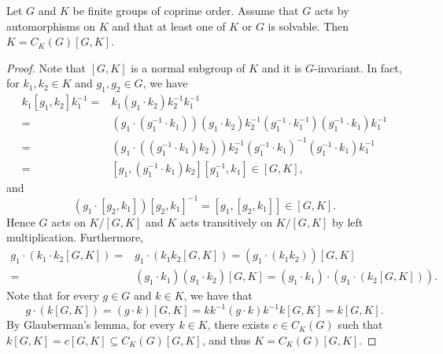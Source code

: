 
%


\begin{theorem}
\label{thm:K=C_K(G)[G,K]}
Let $G$ and $K$ be finite groups of coprime order. Assume that $G$ acts by automorphisms on $K$ and that at least one of $K$ or $G$ is solvable. Then $K=C_K(G)[G,K]$.   
\end{theorem}

\begin{proof}
    Note that $[G,K]$ is a normal subgroup of $K$ and it is $G$-invariant. In fact, for $k_1,k_2\in K$ and $g_1,g_2\in G$, we have
    \begin{align*}
        k_1[g_1,k_2]k_1^{-1}=&k_1(g_1\cdot k_2)k_2^{-1}k_1^{-1}\\
        =& (g_1\cdot (g_1^{-1}\cdot k_1))(g_1\cdot k_2)k_2^{-1}(g_1^{-1}\cdot k_1^{-1})(g_1^{-1}\cdot k_1)k_1^{-1}\\
        =& (g_1\cdot ((g_1^{-1}\cdot k_1)k_2))k_2^{-1}(g_1^{-1}\cdot k_1)^{-1}(g_1^{-1}\cdot k_1)k_1^{-1}\\
        =& [g_1,(g_1^{-1}\cdot k_1)k_2][g_1^{-1},k_1]\in [G,K],
    \end{align*}
    and
    \[ (g_1\cdot [g_2,k_1])[g_2,k_1]^{-1}=[g_1,[g_2,k_1]]\in [G,K].\]
    Hence $G$ acts on $K/[G,K]$ and $K$ acts transitively on $K/[G,K]$ by left multiplication. Furthermore,
    \begin{align*}
        g_1\cdot (k_1\cdot k_2[G,K])=&g_1\cdot (k_1k_2[G,K])=(g_1\cdot (k_1k_2))[G,K]\\
        =&(g_1\cdot k_1)(g_1\cdot k_2)[G,K]=(g_1\cdot k_1)\cdot(g_1\cdot (k_2[G,K])).
    \end{align*}
    Note that for every $g\in G$ and $k\in K$, we have that
    \[g\cdot (k[G,K])=(g\cdot k)[G,K]=kk^{-1}(g\cdot k)k^{-1}k[G,K]=k[G,K].\]
    By Glauberman's lemma, for every $k\in K$, there exists $c\in C_K(G)$ such that $k[G,K]=c[G,K]\subseteq C_K(G)[G,K]$, and thus $K=C_K(G)[G,K]$.   
\end{proof}

